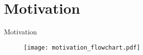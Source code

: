 \section{Motivation}
\begin{frame}{Motivation}
\begin{figure}
\centering

\texttt{[image: motivation\_flowchart.pdf]}
\end{figure}

\end{frame}
